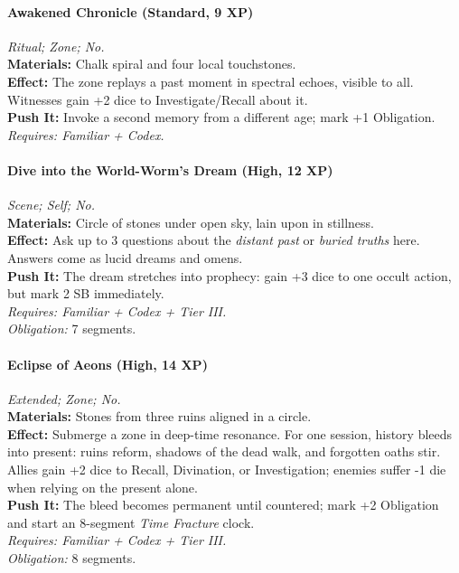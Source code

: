 \paragraph{Awakened Chronicle (Standard, 9 XP)} \emph{Ritual; Zone; No.}\\
\textbf{Materials:} Chalk spiral and four local touchstones.\\
\textbf{Effect:} The zone replays a past moment in spectral echoes, visible to all. Witnesses gain +2 dice to Investigate/Recall about it.\\
\textbf{Push It:} Invoke a second memory from a different age; mark +1 Obligation.\\
\emph{Requires: Familiar + Codex.}

\paragraph{Dive into the World-Worm’s Dream (High, 12 XP)} \emph{Scene; Self; No.}\\
\textbf{Materials:} Circle of stones under open sky, lain upon in stillness.\\
\textbf{Effect:} Ask up to 3 questions about the \emph{distant past} or \emph{buried truths} here. Answers come as lucid dreams and omens.\\
\textbf{Push It:} The dream stretches into prophecy: gain +3 dice to one occult action, but mark 2 SB immediately.\\
\emph{Requires: Familiar + Codex + Tier III.}\\
\emph{Obligation:} 7 segments.

\paragraph{Eclipse of Aeons (High, 14 XP)} \emph{Extended; Zone; No.}\\
\textbf{Materials:} Stones from three ruins aligned in a circle.\\
\textbf{Effect:} Submerge a zone in deep-time resonance. For one session, history bleeds into present: ruins reform, shadows of the dead walk, and forgotten oaths stir. Allies gain +2 dice to Recall, Divination, or Investigation; enemies suffer -1 die when relying on the present alone.\\
\textbf{Push It:} The bleed becomes permanent until countered; mark +2 Obligation and start an 8-segment \emph{Time Fracture} clock.\\
\emph{Requires: Familiar + Codex + Tier III.}\\
\emph{Obligation:} 8 segments.

